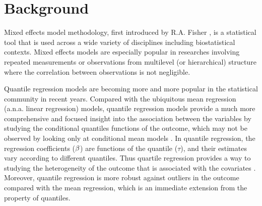 \documentclass{article}
\begin{document}
\section{Background}
\indent Mixed effects model methodology, first introduced by R.A. Fisher \cite{fisher1919xv},  is a statistical tool that is used across a wide variety of disciplines including biostatistical contexts. Mixed effects models are especially popular in researches involving repeated measurements or observations from multilevel (or hierarchical) structure where the correlation between observations is not negligible.\par

Quantile regression models are becoming more and more popular in the statistical community in recent years. Compared with the ubiquitous mean regression (a.n.a. linear regression) models, quantile regression models provide a much more comprehensive and focused insight into the association between the variables by studying the conditional quantiles functions of the outcome,  which may not be observed by looking only at conditional mean models \cite{koenker2005quantile}. In quantile regression, the regression coefficients (${\bf \beta}$) are functions of the quantile ($\tau$), and their estimates vary according to different quantiles. Thus quartile regression provides a way to studying the heterogeneity of the outcome that is associated with the covariates \cite{koenker2005quantile}. Moreover, quantile regression is more robust against outliers in the outcome compared with the mean regression, which is an immediate extension from the property of quantiles. \par
\end{document}
